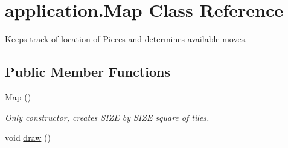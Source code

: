 \hypertarget{classapplication_1_1_map}{\section{application.\+Map Class Reference}
\label{classapplication_1_1_map}
}


Keeps track of location of Pieces and determines available moves.  


\subsection*{Public Member Functions}
\begin{DoxyCompactItemize}
\item 
\hypertarget{classapplication_1_1_map_a4b89e6a6153b710c4186559c1b9b22b6}{\hyperlink{classapplication_1_1_map_a4b89e6a6153b710c4186559c1b9b22b6}{Map} ()}\label{classapplication_1_1_map_a4b89e6a6153b710c4186559c1b9b22b6}

\begin{DoxyCompactList}\small\item\em Only constructor, creates S\+I\+Z\+E by S\+I\+Z\+E square of tiles. \end{DoxyCompactList}\item 
\hypertarget{classapplication_1_1_map_a0b9639952785a325be6f0251e4120658}{void \hyperlink{classapplication_1_1_map_a0b9639952785a325be6f0251e4120658}{draw} ()}\label{classapplication_1_1_map_a0b9639952785a325be6f0251e4120658}


\end{DoxyCompactItemize}
